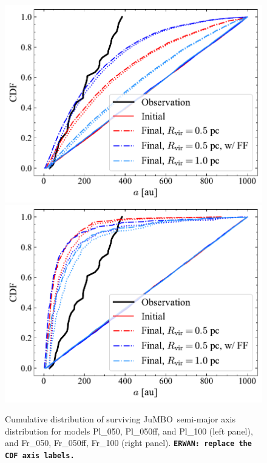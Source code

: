\documentclass[submission,phys]{lib/SciPost}
\newcommand{\erwan}[1] {{\texttt{\textbf{ERWAN: #1}}} }
\newcommand{\jumbo}{\mbox{JuMBO}}
\begin{document}
\begin{figure}
    \centering
    \includegraphics[width=0.49\columnwidth]{figures/Plummer_General_sem_axis.pdf}
    \includegraphics[width=0.49\columnwidth]{figures/Fractal_General_sem_axis.pdf}
    \caption{Cumulative distribution of surviving \jumbo\, semi-major
      axis distribution for models Pl\_050, Pl\_050ff, and Pl\_100
      (left panel), and Fr\_050, Fr\_050ff, Fr\_100 (right panel).
    \erwan{replace the CDF axis labels.}}
    \label{Fig:Gen_Semi_Plummer}
    \label{Fig:Gen_Semi_Fractal}
\end{figure}
\end{document}
